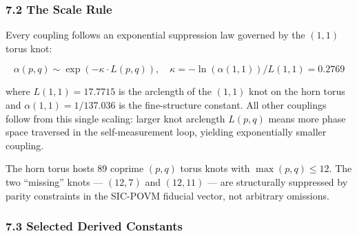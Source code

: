 \documentclass[12pt,a4paper]{article}
\begin{document}
\hypertarget{the-scale-rule}{%
\subsubsection{7.2 The Scale Rule}\label{the-scale-rule}}

Every coupling follows an exponential suppression law governed by the
\((1,1)\) torus knot:

\[\alpha(p,q) \sim \exp(-\kappa \cdot L(p,q)), \quad \kappa = -\ln(\alpha(1,1)) / L(1,1) = 0.2769\]

where \(L(1,1) = 17.7715\) is the arclength of the \((1,1)\) knot on the
horn torus and \(\alpha(1,1) = 1/137.036\) is the fine-structure
constant. All other couplings follow from this single scaling: larger
knot arclength \(L(p,q)\) means more phase space traversed in the
self-measurement loop, yielding exponentially smaller coupling.

The horn torus hosts 89 coprime \((p,q)\) torus knots with
\(\max(p,q) \leq 12\). The two ``missing'' knots --- \((12,7)\) and
\((12,11)\) --- are structurally suppressed by parity constraints in the
SIC-POVM fiducial vector, not arbitrary omissions.

\hypertarget{selected-derived-constants}{%
\subsubsection{7.3 Selected Derived
Constants}\label{selected-derived-constants}}
\end{document}
